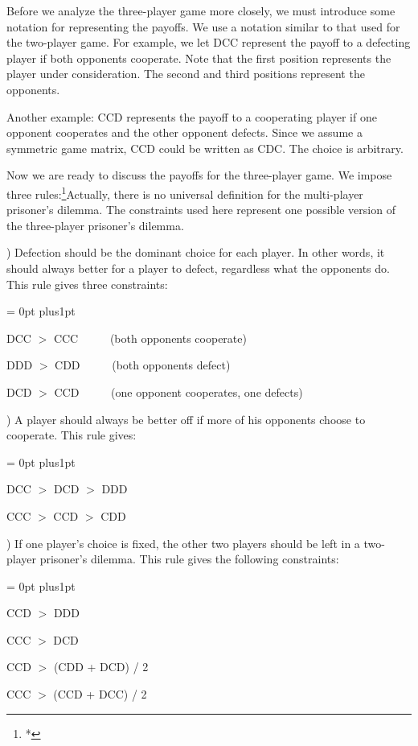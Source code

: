 Before we analyze the three-player game more closely, we must
introduce some notation for representing the payoffs. We use a
notation similar to that used for the two-player game. For example, we
let DCC represent the payoff to a defecting player if both opponents
cooperate. Note that the first position represents the player under
consideration. The second and third positions represent the opponents.

Another example: CCD represents the payoff to a cooperating player if
one opponent cooperates and the other opponent defects.  Since we
assume a symmetric game matrix, CCD could be written as CDC. The
choice is arbitrary.

Now we are ready to discuss the payoffs for the three-player game. We
impose three rules:\footnote{*}{Actually, there is no universal
definition for the multi-player prisoner's dilemma. The constraints
used here represent one possible version of the three-player
prisoner's dilemma.}

) Defection should be the dominant choice for each player.
In other words, it should always better for a player to defect,
regardless what the opponents do. This rule gives three constraints:

{\narrower \narrower
{\parskip = 0pt plus1pt

        DCC $>$ CCC  \ \ \ \ \ (both opponents cooperate)

        DDD $>$ CDD  \ \ \ \ \ (both opponents defect)

        DCD $>$ CCD  \ \ \ \ \ (one opponent cooperates, one defects)

}}

) A player should always be better off if more of his
opponents choose to cooperate. This rule gives:

{\narrower \narrower
{\parskip = 0pt plus1pt

        DCC $>$ DCD $>$ DDD

        CCC $>$ CCD $>$ CDD

}}

) If one player's choice is fixed, the other two players should be
left in a two-player prisoner's dilemma. This rule gives the following
constraints: 

{\narrower \narrower
{\parskip = 0pt plus1pt

        CCD $>$ DDD

        CCC $>$ DCD

        CCD $>$ (CDD + DCD) / 2

        CCC $>$ (CCD + DCC) / 2

}}

